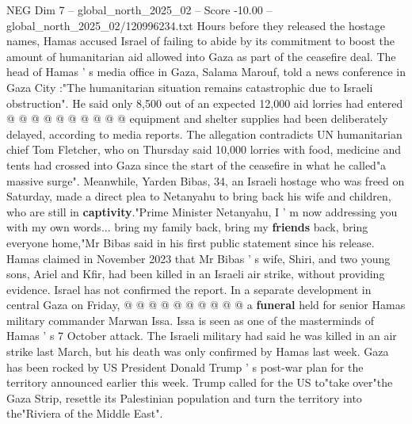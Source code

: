 \begin{textsample}{NEG Dim 7 – global\_north\_2025\_02 – Score -10.00 – global\_north\_2025\_02/120996234.txt}
Hours before they released the hostage names, Hamas accused Israel of failing to abide by its commitment to boost the amount of humanitarian aid allowed into Gaza as part of the ceasefire deal.
The head of Hamas ' s media office in Gaza, Salama Marouf, told a news conference in Gaza City :"The humanitarian situation remains catastrophic due to Israeli obstruction".
He said only 8,500 out of an expected 12,000 aid lorries had entered @ @ @ @ @ @ @ @ @ @ equipment and shelter supplies had been deliberately delayed, according to media reports.
The allegation contradicts UN humanitarian chief Tom Fletcher, who on Thursday said 10,000 lorries with food, medicine and tents had crossed into Gaza since the start of the ceasefire in what he called"a massive surge".
Meanwhile, Yarden Bibas, 34, an Israeli hostage who was freed on Saturday, made a direct plea to Netanyahu to bring back his wife and children, who are still in \textbf{captivity}."Prime Minister Netanyahu, I ' m now addressing you with my own words... bring my family back, bring my \textbf{friends} back, bring everyone home,"Mr Bibas said in his first public statement since his release.
Hamas claimed in November 2023 that Mr Bibas ' s wife, Shiri, and two young sons, Ariel and Kfir, had been killed in an Israeli air strike, without providing evidence.
Israel has not confirmed the report.
In a separate development in central Gaza on Friday, @ @ @ @ @ @ @ @ @ @ a \textbf{funeral} held for senior Hamas military commander Marwan Issa.
Issa is seen as one of the masterminds of Hamas ' s 7 October attack.
The Israeli military had said he was killed in an air strike last March, but his death was only confirmed by Hamas last week.
Gaza has been rocked by US President Donald Trump ' s post-war plan for the territory announced earlier this week.
Trump called for the US to"take over"the Gaza Strip, resettle its Palestinian population and turn the territory into the"Riviera of the Middle East".

\end{textsample}
